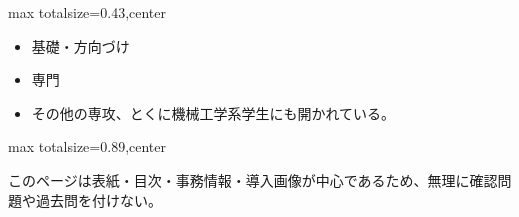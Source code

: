 \clearpage
{}
\begin{minipage}[t]{0.405\textwidth}
\begin{adjustbox}{max totalsize={\textwidth}{0.43\textheight},center}
\begin{minipage}{\textwidth}\scriptsize
{}\begin{itemize}
\item 基礎・方向づけ
\item 専門
\item その他の専攻、とくに機械工学系学生にも開かれている。
\end{itemize}
\end{minipage}
\end{adjustbox}
\end{minipage}\hfill
\begin{minipage}[t]{0.58\textwidth}
\begin{adjustbox}{max totalsize={\textwidth}{0.89\textheight},center}
\begin{minipage}{\textwidth}\scriptsize
{}このページは表紙・目次・事務情報・導入画像が中心であるため、無理に確認問題や過去問を付けない。
\end{minipage}
\end{adjustbox}
\end{minipage}


